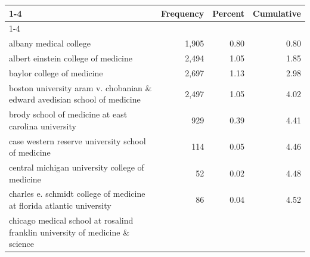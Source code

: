 \begin{table}[!h]
\centering
\begin{tabular}{llll}
\cline{1-4}
\multicolumn{1}{c}{} &
  \multicolumn{1}{r}{Frequency} &
  \multicolumn{1}{r}{Percent} &
  \multicolumn{1}{r}{Cumulative} \\
\cline{1-4}
\multicolumn{1}{l}{Medical School
Name} &
  \multicolumn{1}{r}{} &
  \multicolumn{1}{r}{} &
  \multicolumn{1}{r}{} \\
\multicolumn{1}{l}{\hspace{1em}albany medical college} &
  \multicolumn{1}{r}{1,905} &
  \multicolumn{1}{r}{0.80} &
  \multicolumn{1}{r}{0.80} \\
\multicolumn{1}{l}{\hspace{1em}albert einstein college of medicine} &
  \multicolumn{1}{r}{2,494} &
  \multicolumn{1}{r}{1.05} &
  \multicolumn{1}{r}{1.85} \\
\multicolumn{1}{l}{\hspace{1em}baylor college of medicine} &
  \multicolumn{1}{r}{2,697} &
  \multicolumn{1}{r}{1.13} &
  \multicolumn{1}{r}{2.98} \\
\multicolumn{1}{l}{\hspace{1em}boston university aram v. chobanian \& edward avedisian school of medicine} &
  \multicolumn{1}{r}{2,497} &
  \multicolumn{1}{r}{1.05} &
  \multicolumn{1}{r}{4.02} \\
\multicolumn{1}{l}{\hspace{1em}brody school of medicine at east carolina university} &
  \multicolumn{1}{r}{929} &
  \multicolumn{1}{r}{0.39} &
  \multicolumn{1}{r}{4.41} \\
\multicolumn{1}{l}{\hspace{1em}case western reserve university school of medicine} &
  \multicolumn{1}{r}{114} &
  \multicolumn{1}{r}{0.05} &
  \multicolumn{1}{r}{4.46} \\
\multicolumn{1}{l}{\hspace{1em}central michigan university college of medicine} &
  \multicolumn{1}{r}{52} &
  \multicolumn{1}{r}{0.02} &
  \multicolumn{1}{r}{4.48} \\
\multicolumn{1}{l}{\hspace{1em}charles e. schmidt college of medicine at florida atlantic university} &
  \multicolumn{1}{r}{86} &
  \multicolumn{1}{r}{0.04} &
  \multicolumn{1}{r}{4.52} \\
\multicolumn{1}{l}{\hspace{1em}chicago medical school at rosalind franklin university of medicine \& science} &

\end{tabular}
\end{table}
